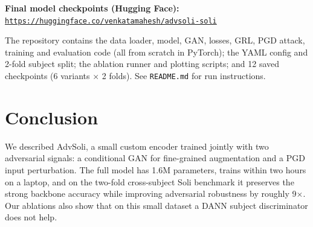 \documentclass[10pt,twocolumn,letterpaper]{article}
\begin{document}
\medskip
\noindent\textbf{Final model checkpoints (Hugging Face):}\\
{\scriptsize\href{https://huggingface.co/venkatamahesh/advsoli-soli/tree/main/checkpoints}{\texttt{https://huggingface.co/venkatamahesh/advsoli-soli}}}

\medskip
\noindent The repository contains the data loader, model, GAN, losses,
GRL, PGD attack, training and evaluation code (all from scratch in
PyTorch); the YAML config and 2-fold subject split; the ablation runner
and plotting scripts; and 12 saved checkpoints (6 variants $\times$ 2
folds). See \texttt{README.md} for run instructions.

\section{Conclusion}

We described AdvSoli, a small custom encoder trained jointly with two
adversarial signals: a conditional GAN for fine-grained augmentation
and a PGD input perturbation. The full model has 1.6M parameters,
trains within two hours on a laptop, and on the
two-fold cross-subject Soli benchmark it preserves the strong backbone
accuracy while improving adversarial robustness by roughly 9$\times$.
Our ablations also show that on this small dataset a DANN subject
discriminator does not help.


{\small


}
\end{document}
